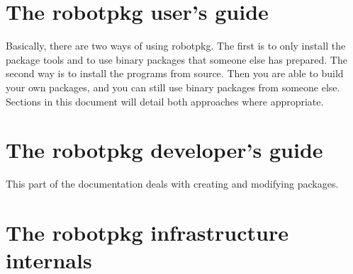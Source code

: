 \documentclass[a4paper,11pt]{book}
\begin{document}
\chapter{The robotpkg user's guide}
\label{chapter:user}

Basically, there are two ways of using robotpkg.  The  first is to only install
the  package tools and to  use binary packages that  someone else has prepared.
The second way is  to install the  programs from source. Then  you are  able to
build your own packages,  and you can  still use  binary packages from  someone
else. Sections in this document will detail both approaches where appropriate.






\chapter{The robotpkg developer's guide}
\label{chapter:developer}

This part of the documentation deals with creating and modifying packages.





\chapter{The robotpkg infrastructure internals}
\label{chapter:internal}
\end{document}
